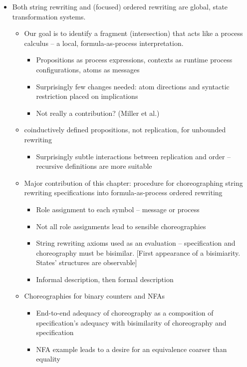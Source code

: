 \begin{itemize}
\item 
  Both string rewriting and (focused) ordered rewriting are global, state transformation systems.
  \begin{itemize}[nosep]
  \item Our goal is to identify a fragment (intersection) that acts like a process calculus -- a local, formula-as-process interpretation.
    \begin{itemize}[nosep]
    \item Propositions as process expressions, contexts as runtime process configurations, atoms as messages 
    \item Surprisingly few changes needed: atom directions and syntactic restriction placed on implications
    \item Not really a contribution?  (Miller et al.)
    \end{itemize}
  \item coinductively defined propositions, not replication, for unbounded rewriting 
 \begin{itemize}[nosep]
    \item Surprisingly subtle interactions between replication and order -- recursive definitions are more suitable 
    \end{itemize}
  \item Major contribution of this chapter: procedure for choreographing string rewriting specifications into formula-as-process ordered rewriting
    \begin{itemize}[nosep]
    \item Role assignment to each symbol -- message or process
    \item Not all role assignments lead to sensible choreographies
    \item String rewriting axioms used as an evaluation -- specification and choreography must be bisimilar.
      [First appearance of a bisimiarity.  States' structures are observable]
    \item Informal description, then formal description 
    \end{itemize}
  \item Choreographies for binary counters and NFAs 
    \begin{itemize}[nosep]
    \item End-to-end adequacy of choreography as a composition of specification's adequacy with bisimilarity of choreography and specification
    \item NFA example leads to a desire for an equivalence coarser than equality 
    \end{itemize}
  \end{itemize}


\end{itemize}
